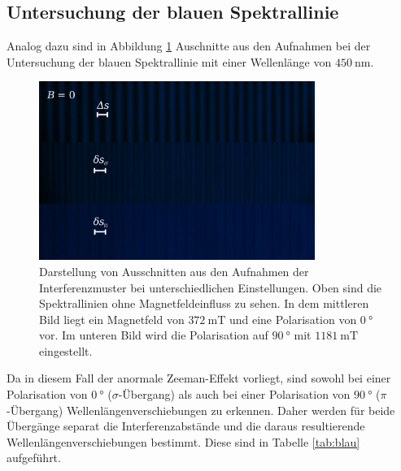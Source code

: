  \subsection{Untersuchung der blauen Spektrallinie}
 Analog dazu sind in Abbildung \ref{fig:blau} Auschnitte aus den Aufnahmen bei der Untersuchung der blauen
 Spektrallinie mit einer Wellenlänge von $\SI{450}{\nano\meter}$.
 \begin{figure}[H]
     \centering
     \includegraphics[width=0.8\textwidth]{images/zebraplot_blau.jpg}
     \caption{Darstellung von Ausschnitten aus den Aufnahmen der Interferenzmuster bei unterschiedlichen
     Einstellungen. Oben sind die Spektrallinien ohne Magnetfeldeinfluss zu sehen. In dem mittleren Bild
     liegt ein Magnetfeld von $\SI{372}{\milli\tesla}$ und eine Polarisation von $\SI{0}{\degree}$ vor. Im
     unteren Bild wird die Polarisation auf $\SI{90}{\degree}$ mit $\SI{1181}{\milli\tesla}$ eingestellt.}
     \label{fig:blau}
 \end{figure} \noindent
 Da in diesem Fall der anormale Zeeman-Effekt vorliegt, sind sowohl bei einer Polarisation von
 $\SI{0}{\degree}$ ($\sigma$-Übergang) als auch bei einer Polarisation von $\SI{90}{\degree}$ ($\pi$-Übergang)
 Wellenlängenverschiebungen zu erkennen. Daher werden für beide Übergänge separat die Interferenzabstände
 und die daraus resultierende Wellenlängenverschiebungen bestimmt. Diese sind in Tabelle \ref{tab:blau}
 aufgeführt.
